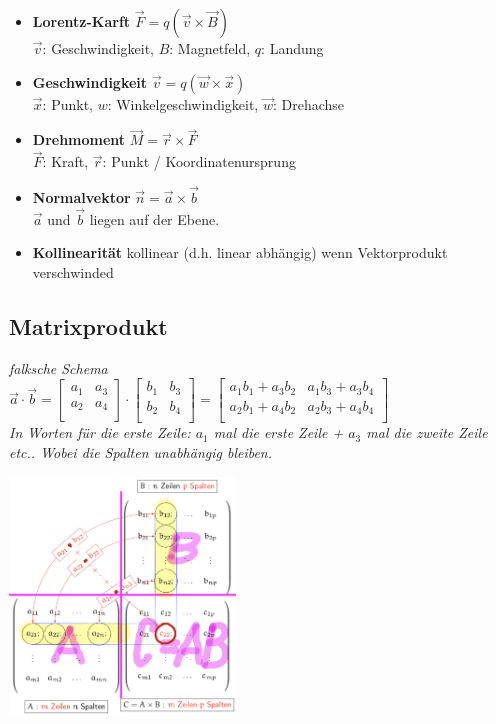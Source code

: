 \begin{itemize}
    \item \textbf{Lorentz-Karft} $\vec{F} = q(\vec{v} \times \vec{B})$ \\
          $\vec{v}$: Geschwindigkeit, $B$: Magnetfeld, $q$: Landung
    \item \textbf{Geschwindigkeit} $\vec{v} = q(\vec{w} \times \vec{x})$ \\
          $\vec{x}$: Punkt, $w$: Winkelgeschwindigkeit, $\vec{w}$: Drehachse
    \item \textbf{Drehmoment} $\vec{M} = \vec{r} \times \vec{F}$ \\
          $\vec{F}$: Kraft, $\vec{r}$: Punkt / Koordinatenursprung
    \item \textbf{Normalvektor} $\vec{n} = \vec{a} \times \vec{b}$ \\
          $\vec{a}$ und $\vec{b}$ liegen auf der Ebene.
    \item \textbf{Kollinearität} kollinear (d.h. linear abhängig) wenn Vektorprodukt verschwinded
\end{itemize}

\subsection{Matrixprodukt}

\textit{falksche Schema} \\

$\vec{a} \cdot \vec{b} = \begin{bmatrix}
a_1 & a_3\\
a_2 & a_4\\
\end{bmatrix} \cdot \begin{bmatrix}
b_1 & b_3 \\
b_2 & b_4 \\
\end{bmatrix} = \begin{bmatrix}
a_1 b_1 + a_3 b_2 & a_1 b_3 + a_3 b_4\\
a_2 b_1 + a_4 b_2 & a_2 b_3 + a_4 b_4\\

\end{bmatrix}$ \\

\textit{In Worten für die erste Zeile: $a_1$ mal die erste Zeile + $a_3$ mal die zweite Zeile etc.. Wobei die Spalten unabhängig bleiben.}

\includegraphics[width=0.45\textwidth]{assets/FalkschesSchema.png}

